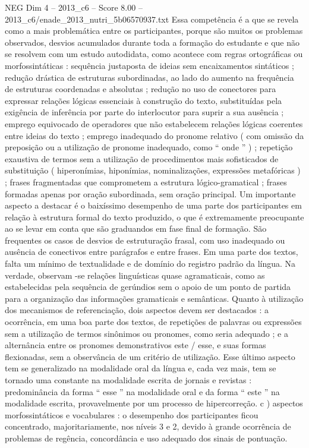 \begin{textsample}{NEG Dim 4 – 2013\_c6 – Score 8.00 – 2013\_c6/enade\_2013\_nutri\_5b06570937.txt}
Essa competência é a que se revela como a mais problemática entre os participantes, porque são muitos os problemas observados, desvios acumulados durante toda a formação do estudante e que não se resolvem com um estudo autodidata, como acontece com regras ortográficas ou morfossintáticas : sequência justaposta de ideias sem encaixamentos sintáticos ; redução drástica de estruturas subordinadas, ao lado do aumento na frequência de estruturas coordenadas e absolutas ; redução no uso de conectores para expressar relações lógicas essenciais à construção do texto, substituídas pela exigência de inferência por parte do interlocutor para suprir a sua ausência ; emprego equivocado de operadores que não estabelecem relações lógicas coerentes entre ideias do texto ; emprego inadequado do pronome relativo ( com omissão da preposição ou a utilização de pronome inadequado, como “ onde ” ) ; repetição exaustiva de termos sem a utilização de procedimentos mais sofisticados de substituição ( hiperonímias, hiponímias, nominalizações, expressões metafóricas ) ; frases fragmentadas que comprometem a estrutura lógico-gramatical ; frases formadas apenas por oração subordinada, sem oração principal.
Um importante aspecto a destacar é o baixíssimo desempenho de uma parte dos participantes em relação à estrutura formal do texto produzido, o que é extremamente preocupante ao se levar em conta que são graduandos em fase final de formação.
São frequentes os casos de desvios de estruturação frasal, com uso inadequado ou ausência de conectivos entre parágrafos e entre frases.
Em uma parte dos textos, falta um mínimo de textualidade e de domínio do registro padrão da língua.
Na verdade, observam -se relações linguísticas quase agramaticais, como as estabelecidas pela sequência de gerúndios sem o apoio de um ponto de partida para a organização das informações gramaticais e semânticas.
Quanto à utilização dos mecanismos de referenciação, dois aspectos devem ser destacados : a ocorrência, em uma boa parte dos textos, de repetições de palavras ou expressões sem a utilização de termos sinônimos ou pronomes, como seria adequado ; e a alternância entre os pronomes demonstrativos este / esse, e suas formas flexionadas, sem a observância de um critério de utilização.
Esse último aspecto tem se generalizado na modalidade oral da língua e, cada vez mais, tem se tornado uma constante na modalidade escrita de jornais e revistas : predominância da forma “ esse ” na modalidade oral e da forma “ este ” na modalidade escrita, provavelmente por um processo de hipercorreção. c ) aspectos morfossintáticos e vocabulares : o desempenho dos participantes ficou concentrado, majoritariamente, nos níveis 3 e 2, devido à grande ocorrência de problemas de regência, concordância e uso adequado dos sinais de pontuação.

\end{textsample}
